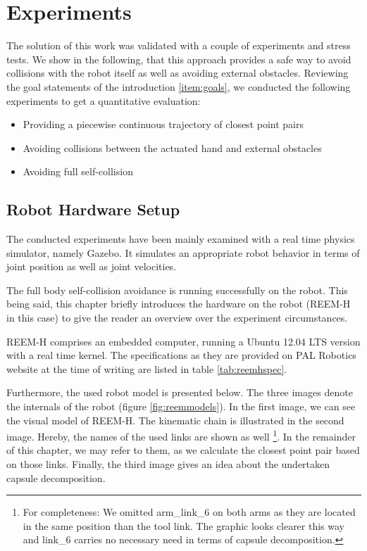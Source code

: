 \chapter{Experiments}
\label{chapter:experiments}
The solution of this work was validated with a couple of experiments and stress tests. We show in the following, that this approach provides a safe way to avoid collisions with the robot itself as well as avoiding external obstacles. Reviewing the goal statements of the introduction \ref{item:goals}, we conducted the following experiments to get a quantitative evaluation:
\begin{itemize}
	\item Providing a piecewise continuous trajectory of closest point pairs
	\item Avoiding collisions between the actuated hand and external obstacles
	\item Avoiding full self-collision 
\end{itemize}

\section{Robot Hardware Setup}
The conducted experiments have been mainly examined with a real time physics simulator, namely Gazebo. It simulates an appropriate robot behavior in terms of joint position as well as joint velocities.

The full body self-collision avoidance is running successfully on the robot. This being said, this chapter briefly introduces the hardware on the robot (REEM-H in this case) to give the reader an overview over the experiment circumstances. 

REEM-H comprises an embedded computer, running a Ubuntu 12.04 LTS version with a real time kernel. The specifications as they are provided on PAL Robotics website at the time of writing are listed in table \ref{tab:reemhspec}. 

Furthermore, the used robot model is presented below. The three images denote the internals of the robot (figure \ref{fig:reemmodels}). In the first image, we can see the visual model of REEM-H. The kinematic chain is illustrated in the second image. Hereby, the names of the used links are shown as well \footnote{For completeness: We omitted arm\_link\_6 on both arms as they are located in the same position than the tool link. The graphic looks clearer this way and link\_6 carries no necessary need in terms of capsule decomposition.}. In the remainder of this chapter, we may refer to them, as we calculate the closest point pair based on those links. Finally, the third image gives an idea about the undertaken capsule decomposition. 

